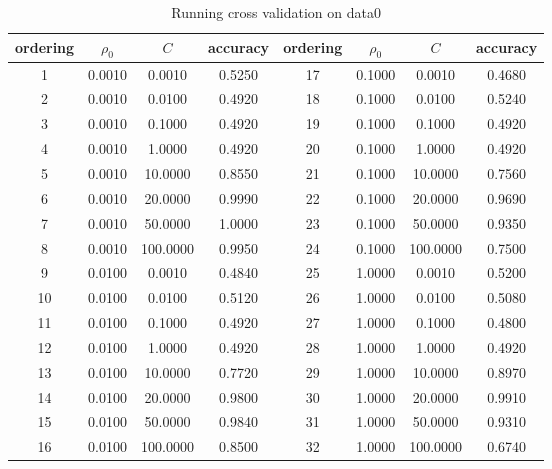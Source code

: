 \documentclass[12pt, fullpage,letterpaper]{article}
\begin{document}
\begin{enumerate}
\begin{table}[h] 
    \centering
    \begin{tabular}{|c|c|c|c|c|c|c|c|}
    \hline
  ordering  &$\rho_0$& $C$ & accuracy & ordering &  $\rho_0$& $C$ & accuracy \\
    \hline
 1& 0.0010 & 0.0010 & 0.5250 & 17& 0.1000 & 0.0010 & 0.4680\\
 2& 0.0010 & 0.0100 & 0.4920 & 18& 0.1000 & 0.0100 & 0.5240\\
 3& 0.0010 & 0.1000 & 0.4920 & 19&0.1000 & 0.1000 & 0.4920\\
 4& 0.0010 & 1.0000 & 0.4920 & 20 &0.1000 & 1.0000 & 0.4920\\
 5& 0.0010 & 10.0000 & 0.8550 & 21& 0.1000 & 10.0000 & 0.7560\\
 6& 0.0010 & 20.0000 & 0.9990 & 22& 0.1000 & 20.0000 & 0.9690\\
7& 0.0010 & 50.0000 & 1.0000 & 23& 0.1000 & 50.0000 & 0.9350\\
8& 0.0010 & 100.0000 & 0.9950 & 24 &0.1000 & 100.0000 & 0.7500\\
9& 0.0100 & 0.0010 & 0.4840 & 25& 1.0000 & 0.0010 & 0.5200\\
10& 0.0100 & 0.0100 & 0.5120 & 26& 1.0000 & 0.0100 & 0.5080\\
11& 0.0100 & 0.1000 & 0.4920 & 27& 1.0000 & 0.1000 & 0.4800\\
12& 0.0100 & 1.0000 & 0.4920 & 28 & 1.0000 & 1.0000 & 0.4920\\
13& 0.0100 & 10.0000 & 0.7720 & 29& 1.0000 & 10.0000 & 0.8970\\
14& 0.0100 & 20.0000 & 0.9800 & 30 &1.0000 & 20.0000 & 0.9910\\
15& 0.0100 & 50.0000 & 0.9840 & 31& 1.0000 & 50.0000 & 0.9310\\
16& 0.0100 & 100.0000 & 0.8500 & 32 & 1.0000 & 100.0000 & 0.6740\\

      \hline
    \end{tabular}
    \caption{Running cross validation on data0 }\label{t:3}
  \end{table}



\end{enumerate}
\end{document}
